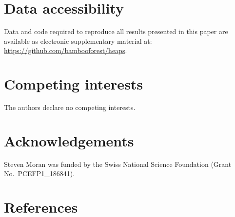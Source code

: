 \documentclass[
]{article}
\begin{document}
\hypertarget{data-accessibility}{%
\section{Data accessibility}\label{data-accessibility}}

Data and code required to reproduce all results presented in this paper
are available as electronic supplementary material at:
\url{https://github.com/bambooforest/heaps}.

\hypertarget{competing-interests}{%
\section{Competing interests}\label{competing-interests}}

The authors declare no competing interests.

\hypertarget{acknowledgements}{%
\section{Acknowledgements}\label{acknowledgements}}

Steven Moran was funded by the Swiss National Science Foundation (Grant
No.~PCEFP1\_186841).

\hypertarget{references}{%
\section*{References}\label{references}}
\end{document}
